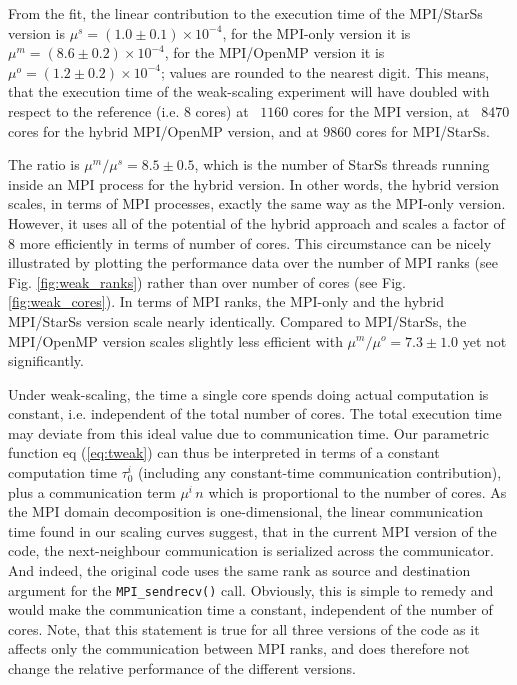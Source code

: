 \documentclass[conference]{IEEEtran}
\newcommand{\starss}{{StarSs}}
\begin{document}
From the fit, the linear contribution to the execution time of the
MPI/\starss{} version is $\mu^s = (1.0 \pm 0.1) \times 10^{-4}$,
for the MPI-only version it is $\mu^m = (8.6 \pm 0.2) \times
10^{-4}$, for the MPI/OpenMP version it is $\mu^o = (1.2 \pm 0.2)
\times 10^{-4}$; values are rounded to the nearest digit. This
means, that the execution time of the weak-scaling experiment will
have doubled with respect to the reference (i.e. 8 cores) at ~$1160$
cores for the MPI version, at ~$8470$ cores for the hybrid MPI/OpenMP
version, and at $9860$ cores for MPI/\starss{}.

The ratio is $\mu^m/\mu^s = 8.5 \pm 0.5$, which is the
number of \starss{} threads running inside an MPI process for the hybrid
version. In other words, the hybrid version scales, in terms of MPI processes,
exactly the same way as the MPI-only version. However, it uses all of the
potential of the hybrid approach and scales a factor of 8 more efficiently in
terms of number of cores. This circumstance can be nicely illustrated by plotting
the performance data over the number of MPI ranks (see Fig.
\ref{fig:weak_ranks}) rather than over number of cores (see Fig.
\ref{fig:weak_cores}). In terms of MPI ranks, the MPI-only and the hybrid
MPI/\starss{} version scale nearly identically.
Compared to MPI/\starss{}, the MPI/OpenMP version
scales slightly less efficient with $\mu^m/\mu^o = 7.3 \pm 1.0$ yet not
significantly.

Under weak-scaling, the time a single core spends doing actual
computation is constant, i.e. independent of the total number of
cores. The total execution time may deviate from this ideal value due
to communication time. Our parametric function eq (\ref{eq:tweak}) can
thus be interpreted in terms of a constant computation time $\tau^i_0$
(including any constant-time communication contribution), plus a
communication term $\mu^i \, n$ which is proportional to the number of
cores. As the MPI domain decomposition is one-dimensional, the linear
communication time found in our scaling curves suggest, that in the
current MPI version of the code, the next-neighbour communication is
serialized across the communicator. And indeed, the original code
uses the same rank as source and destination argument for the
\verb!MPI_sendrecv()! call.  Obviously, this is simple to remedy and
would make the communication time a constant, independent of the number
of cores. Note, that this statement is true for all three versions of
the code as it affects only the communication between MPI ranks,
and does therefore not change the relative performance of the different
versions.
\end{document}
